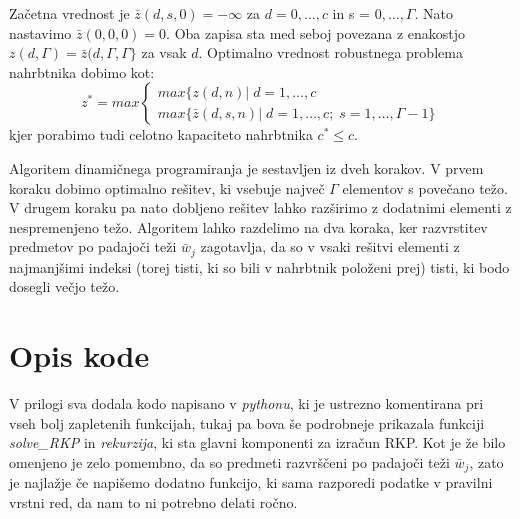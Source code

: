 \documentclass[a4paper,12pt]{article}
\theoremstyle{definition}
\begin{document}
\noindent Začetna vrednost je $\bar{z}(d, s, 0) = -\infty$ za $d = 0, \dots,c$ in s = $0, \dots, \Gamma$. 
Nato nastavimo $\bar{z}(0, 0, 0) = 0$. Oba zapisa sta med seboj povezana z enakostjo $z(d, \Gamma) = 
\bar{z}(d, \Gamma, \Gamma\}$ za vsak $d$. Optimalno vrednost robustnega problema nahrbtnika dobimo kot:
\begin{equation}
\tag*{}
z^{*} = max \begin{cases}
max\{z(d, n) |\; d = 1, \dots, c \\
max\{\bar{z}(d, s, n) |\; d = 1, \dots, c; \;s = 1, \dots, \Gamma -1\}
\end{cases}
\end{equation}
\medskip
kjer porabimo tudi celotno kapaciteto nahrbtnika $c^{*} \leq c$.
\par
Algoritem dinamičnega programiranja je sestavljen iz dveh korakov. V prvem koraku dobimo optimalno 
rešitev, ki vsebuje največ $\Gamma$ elementov s povečano težo. V drugem koraku pa nato dobljeno 
rešitev lahko razširimo z dodatnimi elementi z nespremenjeno težo. Algoritem lahko razdelimo na dva 
koraka, ker razvrstitev predmetov po padajoči teži $\bar{w}_j$ zagotavlja, da so v vsaki rešitvi 
elementi z najmanjšimi indeksi (torej tisti, ki so bili v nahrbtnik položeni prej) tisti, ki bodo 
dosegli večjo težo.

\section{Opis kode}
V prilogi sva dodala kodo napisano v \textit{pythonu}, ki je ustrezno komentirana pri vseh bolj zapletenih 
funkcijah, tukaj pa bova še podrobneje prikazala funkciji \textit{solve\_RKP} in \textit{rekurzija}, ki sta glavni komponenti
za izračun RKP. Kot je že bilo omenjeno je zelo pomembno, da so predmeti razvrščeni po padajoči teži $\bar{w}_j$, zato je najlažje 
če napišemo dodatno funkcijo, ki sama razporedi podatke v pravilni vrstni red, da nam to ni potrebno delati ročno. 
\medskip
\end{document}

